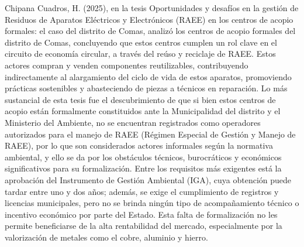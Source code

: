 \documentclass[stu,12pt,a4paper]{apa7}
\begin{document}
Chipana Cuadros, H. (2025), en la tesis Oportunidades y desafíos en la gestión de Residuos de Aparatos Eléctricos y Electrónicos (RAEE) en los centros de acopio formales: el caso del distrito de Comas, analizó los centros de acopio formales del distrito de Comas, concluyendo que estos centros cumplen un rol clave en el circuito de economía circular, a través del reúso y reciclaje de RAEE. Estos actores compran y venden componentes reutilizables, contribuyendo indirectamente al alargamiento del ciclo de vida de estos aparatos, promoviendo prácticas sostenibles y abasteciendo de piezas a técnicos en reparación. Lo más sustancial de esta tesis fue el descubrimiento de que si bien estos centros de acopio están formalmente constituidos ante la Municipalidad del distrito y el Ministerio del Ambiente, no se encuentran registrados como operadores autorizados para el manejo de RAEE (Régimen Especial de Gestión y Manejo de RAEE), por lo que son considerados actores informales según la normativa ambiental, y ello se da por los obstáculos técnicos, burocráticos y económicos significativos para su formalización. Entre los requisitos más exigentes está la aprobación del Instrumento de Gestión Ambiental (IGA), cuya obtención puede tardar entre uno y dos años; además, se exige el cumplimiento de registros y licencias municipales, pero no se brinda ningún tipo de acompañamiento técnico o incentivo económico por parte del Estado. Esta falta de formalización no les permite beneficiarse de la alta rentabilidad del mercado, especialmente por la valorización de metales como el cobre, aluminio y hierro.
\end{document}
